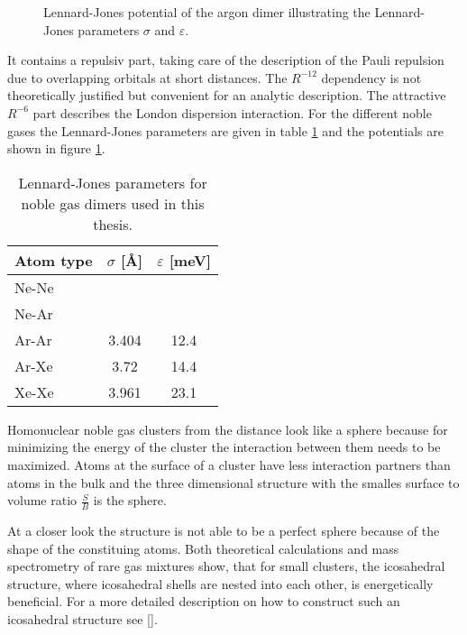 \begin{figure}[h]
 \centering
 
 \caption{Lennard-Jones potential of the argon dimer illustrating the
          Lennard-Jones parameters $\sigma$ and $\varepsilon$.}
 \label{figure:LJ_Ar2}
\end{figure}

It contains a repulsiv part, taking care of the description of the
Pauli repulsion due to overlapping orbitals at short distances. The
$R^{-12}$ dependency is not theoretically justified but convenient
for an analytic description. The attractive $R^{-6}$ part describes
the London dispersion interaction.
For the different noble gases the Lennard-Jones parameters are given in
table \ref{table:LJ_parameter} and the potentials are shown in
figure \ref{figure:LJ_Ar2}.

\begin{table}[htb]
 \caption{Lennard-Jones parameters for noble gas dimers used in this
          thesis.}
 \centering
 \begin{tabular}{lcc}
   \toprule
   Atom type & $\sigma$ [\unit{\AA}] & $\varepsilon$ [\unit{meV}]\\
   \midrule
   Ne-Ne     & &\\
   Ne-Ar     &&\\
   Ar-Ar     &                 3.404 & 12.4\\
   Ar-Xe     &                 3.72  & 14.4\\
   Xe-Xe     &                 3.961 & 23.1\\
   \bottomrule
 \end{tabular}
 \label{table:LJ_parameter}
\end{table}


Homonuclear noble gas clusters from the distance look like a sphere
because for minimizing
the energy of the cluster the interaction between them needs to be
maximized. Atoms at the surface of a cluster have less interaction
partners than atoms in the bulk and the three dimensional structure
with the smalles surface to volume
ratio $\frac{S}{B}$ is the sphere. 

At a closer look the structure is not able to be a perfect sphere
because of the shape of the constituing atoms. Both theoretical
calculations and mass spectrometry of rare gas mixtures show, that
for small clusters, the icosahedral structure, where icosahedral
shells are nested into each other, is energetically beneficial.
For a more detailed description on how to construct such an icosahedral
structure see \ref{}.

